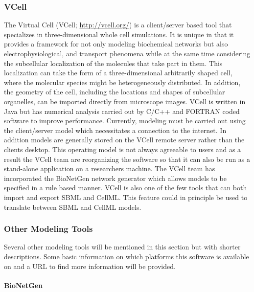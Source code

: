 \documentclass[]{article}
\begin{document}
\subsubsection{VCell}

The Virtual Cell (VCell; \url{http://vcell.org/}) \autocite{VCELL}
\autocite{moraru2008virtual} is a client/server based tool that
specializes in three-dimensional whole cell simulations. It is unique in
that it provides a framework for not only modeling biochemical networks
but also electrophysiological, and transport phenomena while at the same
time considering the subcellular localization of the molecules that take
part in them. This localization can take the form of a three-dimensional
arbitrarily shaped cell, where the molecular species might be
heterogeneously distributed. In addition, the geometry of the cell,
including the locations and shapes of subcellular organelles, can be
imported directly from microscope images. VCell is written in Java but
has numerical analysis carried out by C/C++ and FORTRAN coded software
to improve performance. Currently, modeling must be carried out using
the client/server model which necessitates a connection to the internet.
In addition models are generally stored on the VCell remote server
rather than the clients desktop. This operating model is not always
agreeable to users and as a result the VCell team are reorganizing the
software so that it can also be run as a stand-alone application on a
researchers machine. The VCell team has incorporated the BioNetGen
\autocite{blinov2004bionetgen} network generator which allows models to
be specified in a rule based manner. VCell is also one of the few tools
that can both import and export SBML and CellML. This feature could in
principle be used to translate between SBML and CellML models.

\subsubsection{Other Modeling Tools}

Several other modeling tools will be mentioned in this section but with
shorter descriptions. Some basic information on which platforms this
software is available on and a URL to find more information will be
provided.

\paragraph{BioNetGen \autocite{blinov2004bionetgen}}
\end{document}
